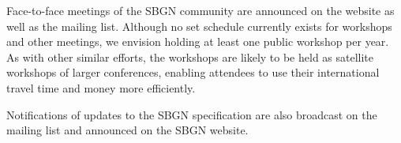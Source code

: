 Face-to-face meetings of the SBGN community are announced on the website as well as the mailing list.  Although no set schedule currently exists for workshops and other meetings, we envision holding at least one public workshop per year.  As with other similar efforts, the workshops are likely to be held as satellite workshops of larger conferences, enabling attendees to use their international travel time and money more efficiently.

Notifications of updates to the SBGN specification are also broadcast on the mailing list and announced on the SBGN website.



